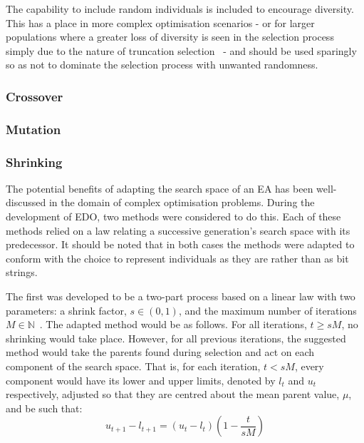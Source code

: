 The capability to include random individuals is included to encourage diversity.
This has a place in more complex optimisation scenarios \-- or for larger
populations where a greater loss of diversity is seen in the selection process
simply due to the nature of truncation selection~\cite{Tatsuya2002} \-- and
should be used sparingly so as not to dominate the selection process with
unwanted randomness.



\subsubsection{Crossover}



\subsubsection{Mutation}



\subsubsection{Shrinking}

The potential benefits of adapting the search space of an EA has been
well-discussed in the domain of complex optimisation problems. During the
development of EDO, two methods were considered to do this. Each of these
methods relied on a law relating a successive generation's search space with its
predecessor. It should be noted that in both cases the methods were adapted to
conform with the choice to represent individuals as they are rather than as bit
strings.

The first was developed to be a two-part process based on a linear law with two
parameters: a shrink factor, \(s \in (0, 1)\), and the maximum number of
iterations \(M \in \mathbb{N}\)~\cite{Amirjanov2017}. The adapted method would
be as follows. For all iterations, \(t \geq sM\), no shrinking would take place.
However, for all previous iterations, the suggested method would take the
parents found during selection and act on each component of the search space.
That is, for each iteration, \(t < sM\), every component would have its lower
and upper limits, denoted by \(l_t\) and \(u_t\) respectively, adjusted so that
they are centred about the mean parent value, \(\mu\), and be such that:
\[
    u_{t+1} - l_{t+1} = (u_t - l_t) \left(1 - \frac{t}{sM}\right)
\]

